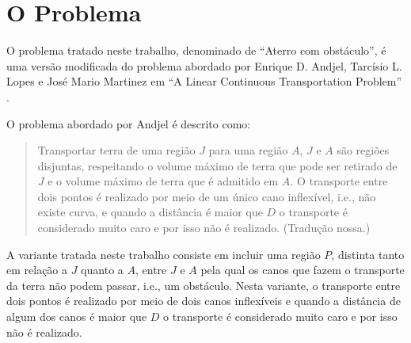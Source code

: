 %
%
%
\section{O Problema}
O problema tratado neste trabalho, denominado de ``Aterro com obstáculo'', é uma
versão modificada do problema abordado por Enrique D. Andjel, Tarcísio L. Lopes
e José Mario Martinez em ``A Linear Continuous Transportation Problem''
\cite{Andjel:1989:TP}.

O problema abordado por Andjel é descrito como:
\begin{quotation}
    Transportar terra de uma região $J$ para uma região $A$, $J$ e $A$ são
    regiões disjuntas, respeitando o volume máximo de terra que pode ser
    retirado de $J$ e o volume máximo de terra que é admitido em $A$. O
    transporte entre dois pontos é realizado por meio de um único cano
    inflexível, i.e., não existe curva, e quando a distância é maior que $D$ o
    transporte é considerado muito caro e por isso não é realizado. (Tradução
    nossa.)
\end{quotation}

A variante tratada neste trabalho consiste em incluir uma região $P$, distinta
tanto em relação a $J$ quanto a $A$, entre $J$ e $A$ pela qual os canos que
fazem o transporte da terra não podem passar, i.e., um obstáculo. Nesta variante,
o transporte entre dois pontos é realizado por meio de dois canos inflexíveis e
quando a distância de algum dos canos é maior que $D$ o transporte é considerado
muito caro e por isso não é realizado.
